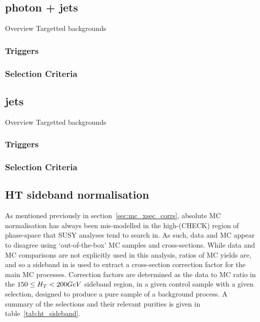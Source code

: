 \subsection{photon + jets}
Overview
Targetted backgrounds
\subsubsection{Triggers}
\subsubsection{Selection Criteria}

\subsection{jets}
Overview
Targetted backgrounds
\subsubsection{Triggers}
\subsubsection{Selection Criteria}

\subsection{HT sideband normalisation}
As mentioned previously in section~\ref{sec:mc_xsec_corrs}, absolute MC 
normalisation has always been mis-modelled in the high-\met (CHECK) region of 
phase-space that SUSY analyses tend to search in. As such, data and MC appear to
disagree using `out-of-the-box' MC samples and cross-sections. While data and MC
comparisons are not explicitly used in this analysis, ratios of MC yields are, 
and so a sideband in \HT is used to extract a cross-section correction factor for the main 
MC processes. Correction factors are determined as the data to MC ratio in the $
150 \leq H_T < 200 GeV$ sideband region, in a given control sample with a 
given selection, designed to produce a pure sample of a background process. A
summary of the selections and their relevant purities is given in table~\ref{tab:ht_sideband}.

